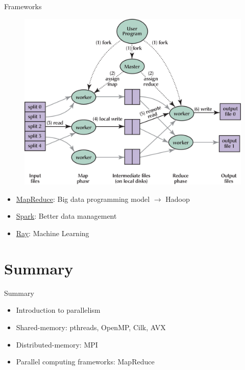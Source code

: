 \documentclass{../TexTemplate/myslide}
\begin{document}
\begin{frame}{Frameworks}
\begin{figure}
\centering
\includegraphics[width=0.6\linewidth]{fig/mapreduce.png}
\end{figure}
\begin{itemize}
\item \href{https://www.tutorialspoint.com/hadoop/hadoop_mapreduce.htm}{MapReduce}: Big data programming model $\to$ Hadoop
\item \href{https://spark.apache.org}{Spark}: Better data management
\item \href{https://rise.cs.berkeley.edu/projects/ray/}{Ray}: Machine Learning
\end{itemize}
\end{frame}

\section{Summary}
\begin{frame}
\sectionpage
\end{frame}

\begin{frame}{Summary}
\begin{itemize}
	\item Introduction to parallelism
	\item Shared-memory: pthreads, OpenMP, Cilk, AVX
	\item Distributed-memory: MPI
	\item Parallel computing frameworks: MapReduce
\end{itemize}
\end{frame}
\end{document}
